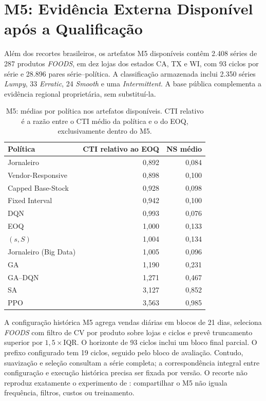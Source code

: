 \section{M5: Evidência Externa Disponível após a Qualificação}
\label{sec:resultados_m5}

Além dos recortes brasileiros, os artefatos M5 disponíveis contêm 2.408 séries de 287 produtos \textit{FOODS}, em dez lojas dos estados CA, TX e WI, com 93 ciclos por série e 28.896 pares série--política. A classificação armazenada inclui 2.350 séries \textit{Lumpy}, 33 \textit{Erratic}, 24 \textit{Smooth} e uma \textit{Intermittent}. A base pública complementa a evidência regional proprietária, sem substituí-la.

\begin{table}[ht]
\centering\small
\caption{M5: médias por política nos artefatos disponíveis. CTI relativo é a razão entre o CTI médio da política e o do EOQ, exclusivamente dentro do M5.}
\label{tab:m5_sintese}
\begin{tabular}{@{}lrr@{}}
\toprule
Política & CTI relativo ao EOQ & NS médio\\
\midrule
Jornaleiro &0,892&0,084\\
Vendor-Responsive &0,898&0,100\\
Capped Base-Stock &0,928&0,098\\
Fixed Interval &0,942&0,100\\
DQN &0,993&0,076\\
EOQ &1,000&0,133\\
$(s,S)$ &1,004&0,134\\
Jornaleiro (Big Data) &1,005&0,096\\
GA &1,190&0,231\\
GA--DQN &1,271&0,467\\
SA &3,127&0,852\\
PPO &3,563&0,985\\
\bottomrule
\end{tabular}
\end{table}

A configuração histórica M5 agrega vendas diárias em blocos de 21 dias, seleciona \textit{FOODS} com filtro de CV por produto sobre lojas e ciclos e prevê truncamento superior por $1{,}5\times\mathrm{IQR}$. O horizonte de 93 ciclos inclui um bloco final parcial. O prefixo configurado tem 19 ciclos, seguido pelo bloco de avaliação. Contudo, suavização e seleção consultam a série completa; a correspondência integral entre configuração e execução histórica precisa ser fixada por versão. O recorte não reproduz exatamente o experimento de \citet{Zabraoui2025GaDQN}: compartilhar o M5 não iguala frequência, filtros, custos ou treinamento.

